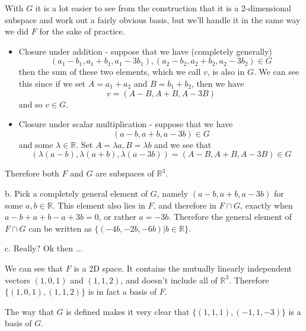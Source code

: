 \documentclass{article}
\newcommand{\chapternumber}{2}
\newenvironment{QandA}{\begin{enumerate}[label=\chapternumber.\arabic*]\bfseries\boldmath}
	{\end{enumerate}}
\newenvironment{answered}{\par\bigskip\normalfont\unboldmath}{}
\begin{document}
\begin{QandA}
\begin{answered}
			With $G$ it is a lot easier to see from the construction that it is a 2-dimensional subspace and work out a fairly obvious basis, but we'll handle it in the same way we did $F$ for the sake of practice.
			\begin{itemize}
				\item Closure under addition - suppose that we have (completely generally)
				\[(a_1-b_1,a_1+b_1,a_1-3b_1),(a_2-b_2,a_2+b_2,a_2-3b_2)\in G\]
				then the sum of these two elements, which we call $v$, is also in $G$.
				We can see this since if we set $A=a_1+a_2$ and $B=b_1+b_2$, then we have
				\[v = (A-B,A+B,A-3B)\] and so $v\in G$.
				\item Closure under scalar multiplication - suppose that we have
				\[(a-b,a+b,a-3b)\in G\] and some $\lambda\in\mathbb{R}$. Set $A=\lambda a,B=\lambda b$ and we see that
				\[(\lambda(a-b),\lambda(a+b),\lambda(a-3b)) = (A-B,A+B,A-3B)\in G\]
			\end{itemize}
			Therefore both $F$ and $G$ are subspaces of $\mathbb{R}^3$.
			
			b. Pick a completely general element of $G$, namely $(a-b,a+b,a-3b)$ for some $a,b\in\mathbb{R}$. This element also lies in $F$, and therefore in $F\cap G$, exactly when $a-b+a+b-a+3b=0$, or rather $a=-3b$. Therefore the general element of $F\cap G$ can be written as $\{(-4b,-2b,-6b)|b\in\mathbb{R}\}$.
			
			c. Really? Ok then ...
			
			We can see that $F$ is a 2D space. It contains the mutually linearly independent vectors $(1,0,1)$ and $(1,1,2)$, and doesn't include all of $\mathbb{R}^3$. Therefore $\{(1,0,1),(1,1,2)\}$ is in fact a basis of $F$.
			
			The way that $G$ is defined makes it very clear that $\{(1,1,1),(-1,1,-3)\}$ is a basis of $G$. 
			

\end{answered}
\end{QandA}
\end{document}
